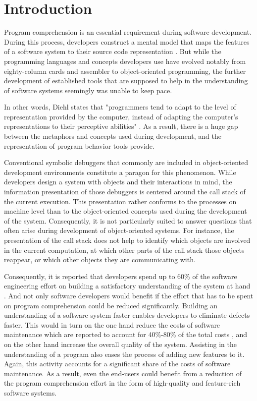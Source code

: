 \chapter{Introduction}
\label{c:introduction}

Program comprehension is an essential requirement during software development.
During this process, developers construct a mental model that maps the features of a software system to their source code representation \cite{latoza_maintaining_2006}.
But while the programming languages and concepts developers use have evolved notably from eighty-column cards and assembler to object-oriented programming, the further development of established tools that are supposed to help in the understanding of software systems seemingly was unable to keep pace.

In other words, Diehl states that "programmers tend to adapt to the level of representation provided by the computer, instead of adapting the computer's representations to their perceptive abilities" \cite{diehl_software_2007}.
As a result, there is a huge gap between the metaphors and concepts used during development, and the representation of program behavior tools provide.

Conventional symbolic debuggers that commonly are included in object-oriented development environments constitute a paragon for this phenomenon.
While developers design a system with objects and their interactions in mind, the information presentation of those debuggers is centered around the call stack of the current execution.
This presentation rather conforms to the processes on machine level than to the object-oriented concepts used during the development of the system.
Consequently, it is not particularly suited to answer questions that often arise during development of object-oriented systems.
For instance, the presentation of the call stack does not help to identify which objects are involved in the current computation, at which other parts of the call stack those objects reappear, or which other objects they are communicating with.

Consequently, it is reported that developers spend up to 60\% of the software engineering effort on building a satisfactory understanding of the system at hand \cite{corbi_program_1989, basili_evolving_1997, ducasse_class_2005, rothlisberger_feature_2007, cornelissen_execution_2008}.
And not only software developers would benefit if the effort that has to be spent on program comprehension could be reduced significantly.
Building an understanding of a software system faster enables developers to eliminate defects faster.
This would in turn on the one hand reduce the costs of software maintenance which are reported to account for 40\%-80\% of the total costs \cite{glass_frequently_2001}, and on the other hand increase the overall quality of the system.
Assisting in the understanding of a program also eases the process of adding new features to it.
Again, this activity accounts for a significant share of the costs of software maintenance.
As a result, even the end-users could benefit from a reduction of the program comprehension effort in the form of high-quality and feature-rich software systems.

